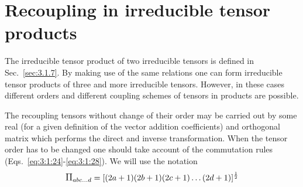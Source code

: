 \section{Recoupling in irreducible tensor products}\label{sec:3.3}
The irreducible tensor product of two irreducible tensors is defined in Sec.~\ref{sec:3.1.7}. By making use of the same relations one can form irreducible tensor products of three and more irreducible tensors. However, in these cases different orders and different coupling schemes of tensors in products are possible.

The recoupling tensors without change of their order may be carried out by some real (for a given definition of the vector addition coefficients) and orthogonal matrix which performs the direct and inverse transformation. When the tensor order has to be changed one should take account of the commutation rules (Eqs.~\eqref{eq:3:1:24}-\eqref{eq:3:1:28}). We will use the notation
\[
\Fact{a b c \ldots d}=[(2 a+1)(2 b+1)(2 c+1) \ldots(2 d+1)]^{\frac{1}{2}}
\]
